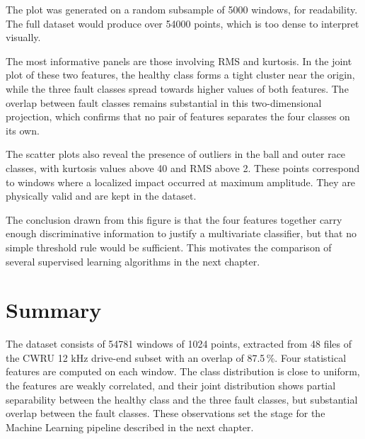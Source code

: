 The plot was generated on a random subsample of \num{5000} windows, for readability. The full dataset would produce over \num{54000} points, which is too dense to interpret visually.

The most informative panels are those involving RMS and kurtosis. In the joint plot of these two features, the healthy class forms a tight cluster near the origin, while the three fault classes spread towards higher values of both features. The overlap between fault classes remains substantial in this two-dimensional projection, which confirms that no pair of features separates the four classes on its own.

The scatter plots also reveal the presence of outliers in the ball and outer race classes, with kurtosis values above 40 and RMS above 2. These points correspond to windows where a localized impact occurred at maximum amplitude. They are physically valid and are kept in the dataset.

The conclusion drawn from this figure is that the four features together carry enough discriminative information to justify a multivariate classifier, but that no simple threshold rule would be sufficient. This motivates the comparison of several supervised learning algorithms in the next chapter.

\section{Summary}

The dataset consists of \num{54781} windows of 1024 points, extracted from 48 files of the CWRU 12 kHz drive-end subset with an overlap of 87.5\,\%. Four statistical features are computed on each window. The class distribution is close to uniform, the features are weakly correlated, and their joint distribution shows partial separability between the healthy class and the three fault classes, but substantial overlap between the fault classes. These observations set the stage for the Machine Learning pipeline described in the next chapter.